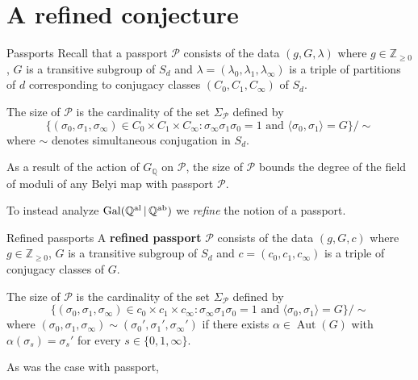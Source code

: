 \documentclass[handout,xcolor=dvipsnames]{beamer}
\theoremstyle{plain}
\newcommand{\QQ}{\mathbb Q}
\newcommand{\ZZ}{\mathbb Z}
\newcommand{\QQal}{{\mathbb Q}^{\textup{al}}}
\newcommand{\QQab}{{\mathbb Q}^{\textup{ab}}}
\DeclareMathOperator{\Aut}{Aut}
\DeclareMathOperator{\Gal}{Gal}
\begin{document}
  \section{A refined conjecture}{
    \begin{frame}{Passports}
      Recall that a passport $\mathcal{P}$
      consists of the data
      $(g,G,\lambda)$
      where $g\in\ZZ_{\geq 0}$,
      $G$ is a transitive subgroup of $S_d$
      and $\lambda = (\lambda_0,\lambda_1,\lambda_\infty)$
      is a triple of partitions of $d$
      corresponding to conjugacy classes $(C_0,C_1,C_\infty)$
      of $S_d$.
      \pause\par
      The size of
      $\mathcal{P}$ is the cardinality of the
      set
      $\Sigma_\mathcal{P}$
      defined by
      \[
        \Big\{
          (\sigma_0,\sigma_1,\sigma_\infty)\in C_0\times C_1\times C_\infty :
          \sigma_\infty\sigma_1\sigma_0=1
          \text{ and }
          \langle\sigma_0,\sigma_1\rangle=G
        \Big\}/\!\!\sim
      \]
      where $\sim$ denotes simultaneous conjugation in $S_d$.
      \pause\par
      As a result of the action of
      $G_\QQ$ on $\mathcal{P}$,
      the size of $\mathcal{P}$ bounds the degree of the field
      of moduli of any Belyi map with passport
      $\mathcal{P}$.
      \pause\par
      To instead analyze
      $\Gal(\QQal\,|\,\QQab)$
      we \emph{refine} the notion of a passport.
    \end{frame}
    \begin{frame}{Refined passports}
      A \textbf{refined passport} $\mathscr{P}$
      consists of the data
      $(g,G,c)$
      where $g\in\ZZ_{\geq 0}$,
      $G$ is a transitive subgroup of $S_d$
      and $c = (c_0,c_1,c_\infty)$
      is a triple of conjugacy classes
      of $G$.
      \pause\par
      The size of
      $\mathscr{P}$ is the cardinality of the
      set
      $\Sigma_\mathscr{P}$
      defined by
      \[
        \Big\{
          (\sigma_0,\sigma_1,\sigma_\infty)\in c_0\times c_1\times c_\infty :
          \sigma_\infty\sigma_1\sigma_0=1
          \text{ and }
          \langle\sigma_0,\sigma_1\rangle=G
        \Big\}/\!\!\sim
      \]
      where
      $(\sigma_0,\sigma_1,\sigma_\infty)\sim
      (\sigma_0',\sigma_1',\sigma_\infty')$
      if there exists $\alpha\in\Aut(G)$
      with $\alpha(\sigma_s) = \sigma_s'$ for
      every $s\in\{0,1,\infty\}$.
      \pause\par
      As was the case with passport,

\end{frame}}
\end{document}
